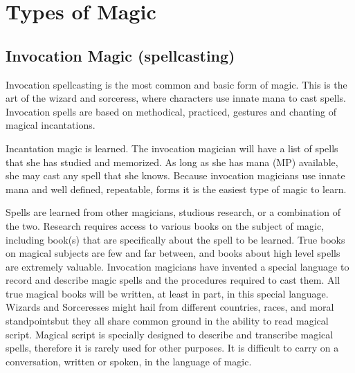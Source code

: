 \documentclass[twoside]{book}
\begin{document}
    

\section{Types of Magic}
    
    

\subsection{Invocation Magic (spellcasting)}
    
    {  
     Invocation spellcasting is the most common and
               basic form of magic. This is the art of the wizard and
               sorceress, where characters use innate mana to cast
               spells. Invocation spells are based on methodical,
               practiced, gestures and chanting of magical incantations.
               
    }
  
    {  
     Incantation magic is learned. The invocation
               magician will have a list of spells that she has studied
               and memorized. As long as she has mana (MP) available, she
               may cast any spell that she knows. Because invocation
               magicians use innate mana and well defined, repeatable,
               forms it is the easiest type of magic to learn. 
    }
  
    {  
     Spells are learned from other magicians, studious
               research, or a combination of the two. Research requires
               access to various books on the subject of magic, including
               book(s) that are specifically about the spell to be
               learned. True books on magical subjects are few and far
               between, and books about high level spells are extremely
               valuable. Invocation magicians have invented a special
               language to record and describe magic spells and the
               procedures required to cast them. All true magical books
               will be written, at least in part, in this special
               language. Wizards and Sorceresses might hail from
               different countries, races, and moral
               standpointsbut they all share common ground in the
               ability to read magical script. Magical script is
               specially designed to describe and transcribe magical
               spells, therefore it is rarely used for other purposes. It
               is difficult to carry on a conversation, written or
               spoken, in the language of magic. 
    }
  
\end{document}
